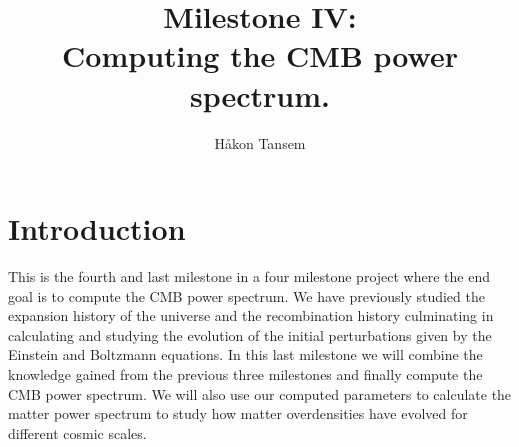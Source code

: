 \documentclass[onecolumn]{aastex62}
\begin{document}
\title{\Large Milestone IV:\\Computing the CMB power spectrum.}

\author{Håkon Tansem}

\section{Introduction} \label{sec:intro}
This is the fourth and last milestone in a four milestone project where the end goal is to compute the CMB power spectrum. We have previously studied the expansion history of the universe and the recombination history culminating in calculating and studying the evolution of the initial perturbations given by the Einstein and Boltzmann equations. In this last milestone we will combine the knowledge gained from the previous three milestones and finally compute the CMB power spectrum. We will also use our computed parameters to calculate the matter power spectrum to study how matter overdensities have evolved for different cosmic scales.
\end{document}
